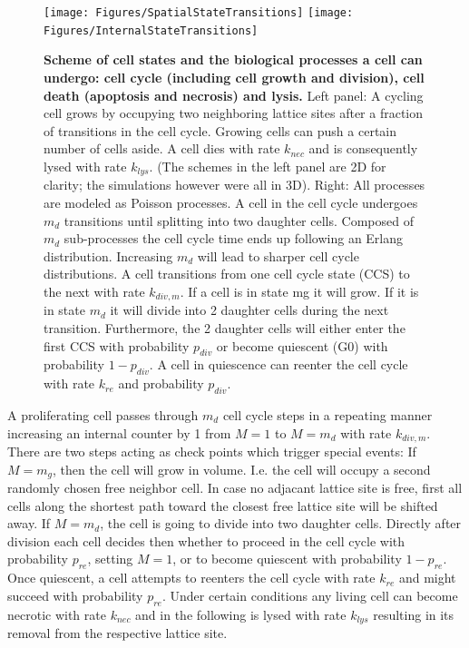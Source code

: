 \documentclass[10pt,letterpaper]{article}
\begin{document}
\begin{figure}[htbp]
\texttt{[image: Figures/SpatialStateTransitions]}
\texttt{[image: Figures/InternalStateTransitions]}
\caption{{\bf Scheme of cell states and the biological processes a cell can undergo: cell cycle (including cell growth and division), cell death (apoptosis and necrosis) and lysis.}
 Left panel: A cycling cell grows by occupying two neighboring lattice sites after a fraction of transitions in the cell cycle. Growing cells can push a certain number of cells aside. A cell dies with rate $k_{nec}$ and is consequently lysed with rate $k_{lys}$. (The schemes in the left panel are 2D for clarity; the simulations however were all in 3D). Right: All processes are modeled as Poisson processes. A cell in the cell cycle undergoes $m_d$ transitions until splitting into two daughter cells. Composed of $m_d$ sub-processes the cell cycle time ends up following an Erlang distribution. Increasing $m_d$ will lead to sharper cell cycle distributions. A cell transitions from one cell cycle state (CCS) to the next with rate $k_{div,m}$. If a cell is in state mg it will grow. If it is in state $m_d$ it will divide into 2 daughter cells during the next transition. Furthermore, the 2 daughter cells will either enter the first CCS with probability $p_{div}$ or become quiescent (G0) with probability $1 - p_{div}$. A cell in quiescence can reenter the cell cycle with rate $k_{re}$ and probability $p_{div}$.
}
\label{fig:cell-states}
\end{figure}

A proliferating cell passes through $m_{d}$ cell cycle steps in a repeating manner increasing an internal counter  by 1 from $M=1$ to $M=m_{d}$ with rate $k_{div,m}$. There are two steps acting as check points which trigger special events: If $M=m_{g}$, then the cell will grow in volume. I.e. the cell will occupy a second randomly chosen free neighbor cell. In case no adjacant lattice site is free, first all cells along the shortest path toward the closest free lattice site will be shifted away. If $M=m_{d}$, the cell is going to divide into two daughter cells. Directly after division each cell decides then whether to proceed in the cell cycle with probability $p_{re}$, setting $M=1$, or to become quiescent with probability $1-p_{re}$. Once quiescent, a cell attempts to reenters the cell cycle with rate $k_{re}$ and might succeed with probability $p_{re}$. Under certain conditions any living cell can become necrotic with rate $k_{nec}$ and in the following is lysed with rate $k_{lys}$ resulting in its removal from the respective lattice site.
\end{document}
